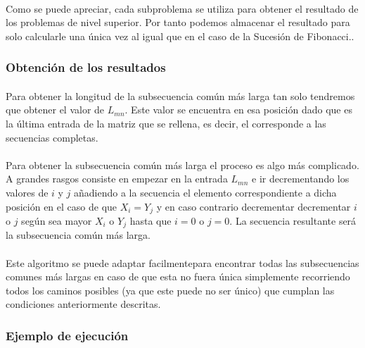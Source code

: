 \documentclass{article}
\begin{document}
			\paragraph{}
			Como se puede apreciar, cada subproblema se utiliza para obtener el resultado de los problemas de nivel superior. Por tanto podemos almacenar el resultado para solo calcularle una única vez al igual que en el caso de la Sucesión de Fibonacci..

		\subsubsection{Obtención de los resultados}
		
			\paragraph{}
			Para obtener la longitud de la subsecuencia común más larga tan solo tendremos que obtener el valor de $L_{mn}$. Este valor se encuentra en esa posición dado que es la última entrada de la matriz que se rellena, es decir, el corresponde a las secuencias completas.

			\paragraph{}
			Para obtener la subsecuencia común más larga el proceso es algo más complicado. A grandes rasgos consiste en empezar en la entrada $L_{mn}$ e ir decrementando los valores de $i$ y $j$ añadiendo a la secuencia el elemento correspondiente a dicha posición en el caso de que $ X_{i} = Y_{j}$ y en caso contrario decrementar decrementar $i$ o $j$ según sea mayor $X_{i}$ o  $Y_{j}$ hasta que $i = 0$ o $j = 0$. La secuencia resultante será la subsecuencia común más larga.

			\paragraph{}
			Este algoritmo se puede adaptar facilmentepara encontrar todas las subsecuencias comunes más largas en caso de que esta no fuera única simplemente recorriendo todos los caminos posibles (ya que este puede no ser único) que cumplan las condiciones anteriormente descritas.

		\subsubsection{Ejemplo de ejecución}
\end{document}
